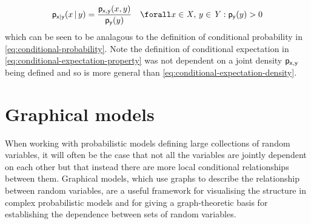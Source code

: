 \begin{equation}\label{eq:conditional-density}
  \pden{\rvar{x}|\rvar{y}}(x\gvn y) =
  \frac{\pden{\rvar{x},\rvar{y}}(x,y)}{\pden{\rvar{y}}(y)}
  \quad \forall x \in \set{X},\, y \in \set{Y} : \pden{\rvar{y}}(y) > 0
\end{equation}
which can be seen to be analagous to the definition of conditional probability in \eqref{eq:conditional-probability}. Note the definition of conditional expectation in \eqref{eq:conditional-expectation-property} was not dependent on a joint density $\mathsf{p}_{\mathsf{x},\mathsf{y}}$ being defined and so is more general than \eqref{eq:conditional-expectation-density}.

\section{Graphical models}\label{sec:graphical-models}

When working with probabilistic models defining large collections of random variables, it will often be the case that not all the variables are jointly dependent on each other but that instead there are more local conditional relationships between them. Graphical models, which use graphs to describe the relationship between random variables, are a useful framework for visualising the structure in complex probabilistic models and for giving a graph-theoretic basis for establishing the dependence between sets of random variables.

